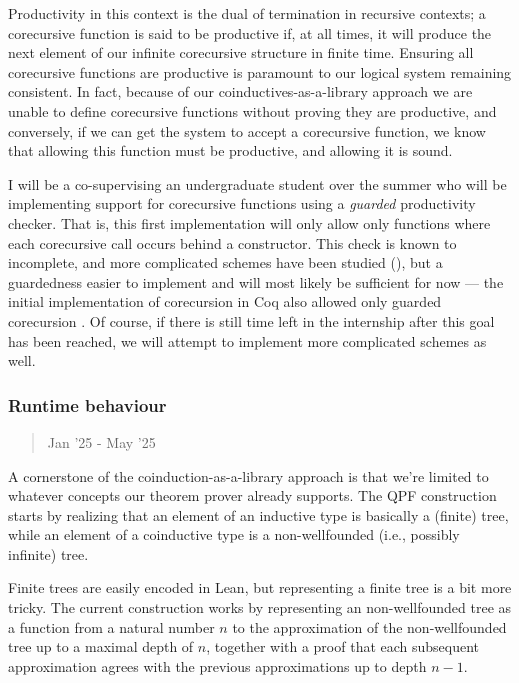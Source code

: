 \documentclass[a4paper]{scrartcl}
\begin{document}
Productivity in this context is the dual of termination in recursive
contexts; a corecursive function is said to be productive if, at all
times, it will produce the next element of our infinite corecursive
structure in finite time. Ensuring all corecursive functions are
productive is paramount to our logical system remaining consistent. In
fact, because of our coinductives-as-a-library approach we are unable to
define corecursive functions without proving they are productive, and
conversely, if we can get the system to accept a corecursive function,
we know that allowing this function must be productive, and allowing it
is sound.

I will be a co-supervising an undergraduate student over the summer who
will be implementing support for corecursive functions using a
\emph{guarded} productivity checker. That is, this first implementation
will only allow only functions where each corecursive call occurs behind
a constructor. This check is known to incomplete, and more complicated
schemes have been studied
(\cite{blanchetteFriendsBenefitsImplementing2017}), but a
guardedness easier to implement and will most likely be sufficient for
now --- the initial implementation of corecursion in Coq also allowed
only guarded corecursion \cite{gimenezTutorialRecursiveTypes1998}.
Of course, if there is still time left in the internship after this goal
has been reached, we will attempt to implement more complicated schemes
as well.



\subsubsection{Runtime behaviour}\label{runtime-behaviour}
\begin{quote}
Jan '25 - May '25
\end{quote}

A cornerstone of the coinduction-as-a-library approach is that we're
limited to whatever concepts our theorem prover already supports. The
QPF construction starts by realizing that an element of an inductive
type is basically a (finite) tree, while an element of a coinductive
type is a non-wellfounded (i.e., possibly infinite) tree.

Finite trees are easily encoded in Lean, but representing a finite tree
is a bit more tricky. The current construction works by representing an
non-wellfounded tree as a function from a natural number \(n\) to the
approximation of the non-wellfounded tree up to a maximal depth of
\(n\), together with a proof that each subsequent approximation agrees
with the previous approximations up to depth \(n-1\).
\end{document}
